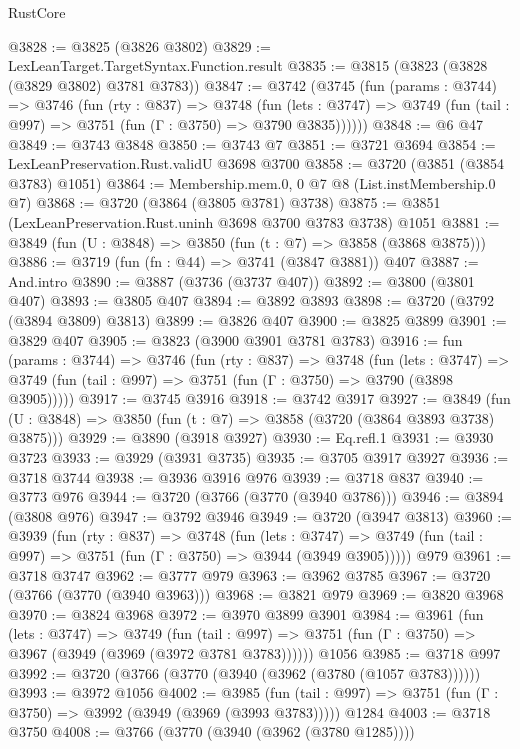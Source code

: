 \begin{lexlean}{RustCore}
\begin{coremodule}
@3828 := @3825 (@3826 @3802)
@3829 := LexLeanTarget.TargetSyntax.Function.result
@3835 := @3815 (@3823 (@3828 (@3829 @3802) @3781 @3783))
@3847 := @3742
    (@3745
      (fun (params : @3744) =>
      @3746
        (fun (rty : @837) =>
        @3748
          (fun (lets : @3747) =>
          @3749 (fun (tail : @997) => @3751 (fun (Γ : @3750) => @3790 @3835))))))
@3848 := @6 @47
@3849 := @3743 @3848
@3850 := @3743 @7
@3851 := @3721 @3694
@3854 := LexLeanPreservation.Rust.validU @3698 @3700
@3858 := @3720 (@3851 (@3854 @3783) @1051)
@3864 := Membership.mem.{0, 0} @7 @8 (List.instMembership.{0} @7)
@3868 := @3720 (@3864 (@3805 @3781) @3738)
@3875 := @3851 (LexLeanPreservation.Rust.uninh @3698 @3700 @3783 @3738) @1051
@3881 := @3849 (fun (U : @3848) => @3850 (fun (t : @7) => @3858 (@3868 @3875)))
@3886 := @3719 (fun (fn : @44) => @3741 (@3847 @3881)) @407
@3887 := And.intro
@3890 := @3887 (@3736 (@3737 @407))
@3892 := @3800 (@3801 @407)
@3893 := @3805 @407
@3894 := @3892 @3893
@3898 := @3720 (@3792 (@3894 @3809) @3813)
@3899 := @3826 @407
@3900 := @3825 @3899
@3901 := @3829 @407
@3905 := @3823 (@3900 @3901 @3781 @3783)
@3916 := fun (params : @3744) =>
  @3746
    (fun (rty : @837) =>
    @3748
      (fun (lets : @3747) =>
      @3749 (fun (tail : @997) => @3751 (fun (Γ : @3750) => @3790 (@3898 @3905)))))
@3917 := @3745 @3916
@3918 := @3742 @3917
@3927 := @3849 (fun (U : @3848) => @3850 (fun (t : @7) => @3858 (@3720 (@3864 @3893 @3738) @3875)))
@3929 := @3890 (@3918 @3927)
@3930 := Eq.refl.{1}
@3931 := @3930 @3723
@3933 := @3929 (@3931 @3735)
@3935 := @3705 @3917 @3927
@3936 := @3718 @3744
@3938 := @3936 @3916 @976
@3939 := @3718 @837
@3940 := @3773 @976
@3944 := @3720 (@3766 (@3770 (@3940 @3786)))
@3946 := @3894 (@3808 @976)
@3947 := @3792 @3946
@3949 := @3720 (@3947 @3813)
@3960 := @3939
    (fun (rty : @837) =>
    @3748
      (fun (lets : @3747) =>
      @3749 (fun (tail : @997) => @3751 (fun (Γ : @3750) => @3944 (@3949 @3905)))))
    @979
@3961 := @3718 @3747
@3962 := @3777 @979
@3963 := @3962 @3785
@3967 := @3720 (@3766 (@3770 (@3940 @3963)))
@3968 := @3821 @979
@3969 := @3820 @3968
@3970 := @3824 @3968
@3972 := @3970 @3899 @3901
@3984 := @3961
    (fun (lets : @3747) =>
    @3749
      (fun (tail : @997) => @3751 (fun (Γ : @3750) => @3967 (@3949 (@3969 (@3972 @3781 @3783))))))
    @1056
@3985 := @3718 @997
@3992 := @3720 (@3766 (@3770 (@3940 (@3962 (@3780 (@1057 @3783))))))
@3993 := @3972 @1056
@4002 := @3985
    (fun (tail : @997) => @3751 (fun (Γ : @3750) => @3992 (@3949 (@3969 (@3993 @3783)))))
    @1284
@4003 := @3718 @3750
@4008 := @3766 (@3770 (@3940 (@3962 (@3780 @1285))))

\end{coremodule}
\end{lexlean}
